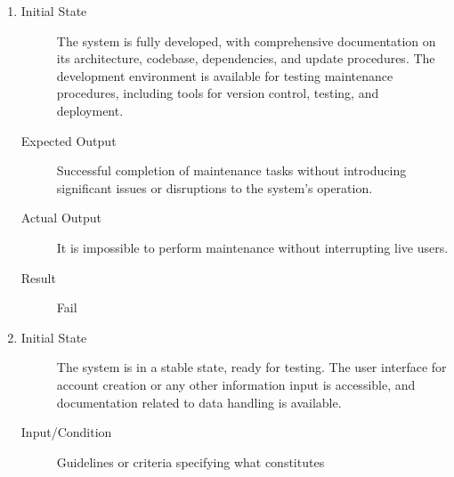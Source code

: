 \documentclass[12pt, titlepage]{article}
\begin{document}
\begin{enumerate}[NFR-T1]
  \item \label{NFRT19}
    \begin{description}
    \item[Initial State] The system is fully developed, with comprehensive
      documentation on its architecture, codebase, dependencies, and update
      procedures. The development environment is available for testing
      maintenance procedures, including tools for version control, testing, and
      deployment.
    \item[Expected Output] Successful completion of maintenance tasks without
      introducing significant issues or disruptions to the system's operation.
    \item[Actual Output] It is impossible to perform maintenance without
      interrupting live users.
    \item[Result] Fail
    \end{description}
  \addtocounter{enumi}{2}
  \item \label{NFRT22}
    \begin{description}
    \item[Initial State] The system is in a stable state, ready for testing. The
      user interface for account creation or any other information input is
      accessible, and documentation related to data handling is available.
    \item[Input/Condition] Guidelines or criteria specifying what constitutes

\end{description}
\end{enumerate}
\end{document}

